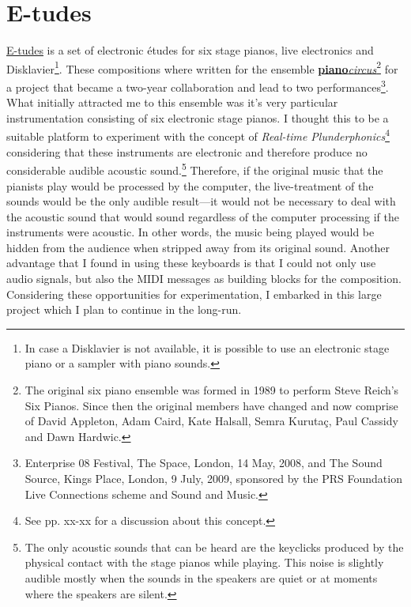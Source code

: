 \hypertarget{chapter5}{}
\chapter{E-tudes}

\href{http://www.ranchonotorious.org/freuben/e-tudes}{E-tudes} is a set of electronic \'{e}tudes for six stage pianos, live electronics and Disklavier\footnote{In case a Disklavier is not available, it is possible to use an electronic stage piano or a sampler with piano sounds.}. These compositions where written for the ensemble \href{http://www.pianocircus.com/}{\textbf{piano}\emph{circus}}\footnote{The original six piano ensemble was formed in 1989 to perform Steve Reich's Six Pianos. Since then the original members have changed and now comprise of David Appleton, Adam Caird, Kate Halsall, Semra Kurutaç, Paul Cassidy and Dawn Hardwic.} for a project that became a two-year collaboration and lead to two performances\footnote{Enterprise 08 Festival, The Space, London, 14 May, 2008, and The Sound Source, Kings Place, London, 9 July, 2009, sponsored by the PRS Foundation Live Connections scheme and Sound and Music.}. What initially attracted me to this ensemble was it's very particular instrumentation consisting of six electronic stage pianos. I thought this to be a suitable platform to experiment with the concept of \emph{Real-time Plunderphonics}\footnote{See pp. xx-xx for a discussion about this concept.} considering that these instruments are electronic and therefore produce no considerable audible acoustic sound.\footnote{The only acoustic sounds that can be heard are the keyclicks produced by the physical contact with the stage pianos while playing. This noise is slightly audible mostly when the sounds in the speakers are quiet or at moments where the speakers are silent.} Therefore, if the original music that the pianists play would be processed by the computer, the live-treatment of the sounds would be the only audible result---it would not be necessary to deal with the acoustic sound that would sound regardless of the computer processing if the instruments were acoustic. In other words, the music being played would be hidden from the audience when stripped away from its original sound. Another advantage that I found in using these keyboards is that I could not only use audio signals, but also the MIDI messages as building blocks for the composition. Considering these opportunities for experimentation, I embarked in this large project which I plan to continue in the long-run. 

